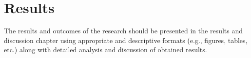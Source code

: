 \chapter{Results}
The results and outcomes of the research should be presented in the results and discussion chapter using appropriate and descriptive formats (e.g., figures, tables, etc.) along with detailed analysis and discussion of obtained results.

